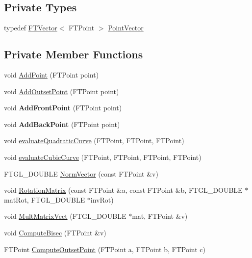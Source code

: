 \subsection*{Private Types}
\begin{DoxyCompactItemize}
\item 
typedef \hyperlink{class_f_t_vector}{F\+T\+Vector}$<$ F\+T\+Point $>$ \hyperlink{class_f_t_contour_a170439e09f11c88af80c13b772b77f84}{Point\+Vector}
\end{DoxyCompactItemize}
\subsection*{Private Member Functions}
\begin{DoxyCompactItemize}
\item 
void \hyperlink{class_f_t_contour_a791ea0ffe2cd46f90a6fefa4f1a369fc}{Add\+Point} (F\+T\+Point point)
\item 
void \hyperlink{class_f_t_contour_a664f820b99921d82f6c675fd2b27f7d7}{Add\+Outset\+Point} (F\+T\+Point point)
\item 
void {\bfseries Add\+Front\+Point} (F\+T\+Point point)\hypertarget{class_f_t_contour_aa36ae9f4f5382b3bd0229c5e0dc1f8cd}{}\label{class_f_t_contour_aa36ae9f4f5382b3bd0229c5e0dc1f8cd}

\item 
void {\bfseries Add\+Back\+Point} (F\+T\+Point point)\hypertarget{class_f_t_contour_a2297abe1dcaf258e5818135e3d560fd1}{}\label{class_f_t_contour_a2297abe1dcaf258e5818135e3d560fd1}

\item 
void \hyperlink{class_f_t_contour_af197f00ef25c397d66ae1f924a5eb20e}{evaluate\+Quadratic\+Curve} (F\+T\+Point, F\+T\+Point, F\+T\+Point)
\item 
void \hyperlink{class_f_t_contour_ae7b958ab6788c205765601839e29afd8}{evaluate\+Cubic\+Curve} (F\+T\+Point, F\+T\+Point, F\+T\+Point, F\+T\+Point)
\item 
F\+T\+G\+L\+\_\+\+D\+O\+U\+B\+LE \hyperlink{class_f_t_contour_a16da794bf4e2ed5828c121d648ba74cb}{Norm\+Vector} (const F\+T\+Point \&v)
\item 
void \hyperlink{class_f_t_contour_ad9b339af3bc9d36304bdbbf2590e4c0f}{Rotation\+Matrix} (const F\+T\+Point \&a, const F\+T\+Point \&b, F\+T\+G\+L\+\_\+\+D\+O\+U\+B\+LE $\ast$mat\+Rot, F\+T\+G\+L\+\_\+\+D\+O\+U\+B\+LE $\ast$inv\+Rot)
\item 
void \hyperlink{class_f_t_contour_a58788008a318851ac2b3198c8ade5397}{Mult\+Matrix\+Vect} (F\+T\+G\+L\+\_\+\+D\+O\+U\+B\+LE $\ast$mat, F\+T\+Point \&v)
\item 
void \hyperlink{class_f_t_contour_a8e7c2a92563b494670a65d5380642f76}{Compute\+Bisec} (F\+T\+Point \&v)
\item 
F\+T\+Point \hyperlink{class_f_t_contour_af5dc9b54b746dbbefc9cfe050df8d795}{Compute\+Outset\+Point} (F\+T\+Point a, F\+T\+Point b, F\+T\+Point c)
\end{DoxyCompactItemize}
